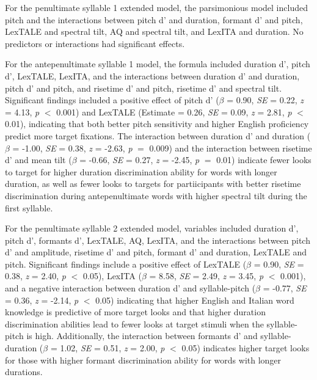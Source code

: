 For the penultimate syllable 1 extended model, the parsimonious model included pitch and the interactions between pitch d' and duration, formant d' and pitch, LexTALE and spectral tilt, AQ and spectral tilt, and LexITA and duration. No predictors or interactions had significant effects.

For the antepenultimate syllable 1 model, the formula included duration d', pitch d', LexTALE, LexITA, and the interactions between duration d' and duration, pitch d' and pitch, and risetime d' and pitch, risetime d' and spectral tilt. Significant findings included a positive effect of pitch d' ($\beta$ = 0.90, \textit{SE} = 0.22, \textit{z} = 4.13, \textit{p} $<$ 0.001) and LexTALE (Estimate = 0.26, \textit{SE} = 0.09, \textit{z} = 2.81, \textit{p} $<$ 0.01), indicating that both better pitch sensitivity and higher English proficiency predict more target fixations. The interaction between duration d' and duration ($\beta$ = -1.00, \textit{SE} = 0.38, \textit{z} = -2.63, \textit{p} $=$ 0.009) and the interaction between risetime d' and mean tilt ($\beta$ = -0.66, \textit{SE} = 0.27, \textit{z} = -2.45, \textit{p} $=$ 0.01) indicate fewer looks to target for higher duration discrimination ability for words with longer duration, as well as fewer looks to targets for partiicipants with better risetime discrimination during antepenultimate words with higher spectral tilt during the first syllable.

For the penultimate syllable 2 extended model, variables included duration d', pitch d', formants d', LexTALE, AQ, LexITA, and the interactions between pitch d' and amplitude, risetime d' and pitch, formant d' and duration, LexTALE and pitch. Significant findings include a positive effect of LexTALE ($\beta$ = 0.90, \textit{SE} = 0.38, \textit{z} = 2.40, \textit{p} $<$ 0.05), LexITA ($\beta$ = 8.58, \textit{SE} = 2.49, \textit{z} = 3.45, \textit{p} $<$ 0.001), and a negative interaction between duration d' and syllable-pitch ($\beta$ = -0.77, \textit{SE} = 0.36, \textit{z} = -2.14, \textit{p} $<$ 0.05) indicating that higher English and Italian word knowledge is predictive of more target looks and that higher duration discrimination abilities lead to fewer looks at target stimuli when the syllable-pitch is high. Additionally, the interaction between formants d' and syllable-duration ($\beta$ = 1.02, \textit{SE} = 0.51, \textit{z} = 2.00, \textit{p} $<$ 0.05) indicates higher target looks for those with higher formant discrimination ability for words with longer durations.

